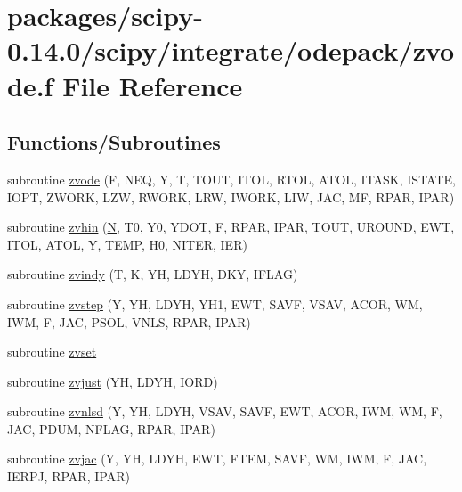 \hypertarget{zvode_8f}{}\section{packages/scipy-\/0.14.0/scipy/integrate/odepack/zvode.f File Reference}
\label{zvode_8f}
\subsection*{Functions/\+Subroutines}
\begin{DoxyCompactItemize}
\item 
subroutine \hyperlink{zvode_8f_af5ace2a9194d9c4094801ada35c63367}{zvode} (F, N\+E\+Q, Y, T, T\+O\+U\+T, I\+T\+O\+L, R\+T\+O\+L, A\+T\+O\+L, I\+T\+A\+S\+K, I\+S\+T\+A\+T\+E, I\+O\+P\+T, Z\+W\+O\+R\+K, L\+Z\+W, R\+W\+O\+R\+K, L\+R\+W, I\+W\+O\+R\+K, L\+I\+W, J\+A\+C, M\+F, R\+P\+A\+R, I\+P\+A\+R)
\item 
subroutine \hyperlink{zvode_8f_afcb58ea2f0858330f2f2fdefc0319f13}{zvhin} (\hyperlink{polmisc_8c_a0240ac851181b84ac374872dc5434ee4}{N}, T0, Y0, Y\+D\+O\+T, F, R\+P\+A\+R, I\+P\+A\+R, T\+O\+U\+T, U\+R\+O\+U\+N\+D, E\+W\+T, I\+T\+O\+L, A\+T\+O\+L, Y, T\+E\+M\+P, H0, N\+I\+T\+E\+R, I\+E\+R)
\item 
subroutine \hyperlink{zvode_8f_ada117a7d58c75ce7276b0c6e0de8cff5}{zvindy} (T, K, Y\+H, L\+D\+Y\+H, D\+K\+Y, I\+F\+L\+A\+G)
\item 
subroutine \hyperlink{zvode_8f_ae33537ae2dd3a997c1f907ea9272dd2d}{zvstep} (Y, Y\+H, L\+D\+Y\+H, Y\+H1, E\+W\+T, S\+A\+V\+F, V\+S\+A\+V, A\+C\+O\+R, W\+M, I\+W\+M, F, J\+A\+C, P\+S\+O\+L, V\+N\+L\+S, R\+P\+A\+R, I\+P\+A\+R)
\item 
subroutine \hyperlink{zvode_8f_a036a28c3bfc3eb5eec8c915d13a78105}{zvset}
\item 
subroutine \hyperlink{zvode_8f_a82ec4f5e05877800fa7114387a9478a3}{zvjust} (Y\+H, L\+D\+Y\+H, I\+O\+R\+D)
\item 
subroutine \hyperlink{zvode_8f_a0cb9d8d31ef5e926dfed8c678ad63cae}{zvnlsd} (Y, Y\+H, L\+D\+Y\+H, V\+S\+A\+V, S\+A\+V\+F, E\+W\+T, A\+C\+O\+R, I\+W\+M, W\+M, F, J\+A\+C, P\+D\+U\+M, N\+F\+L\+A\+G, R\+P\+A\+R, I\+P\+A\+R)
\item 
subroutine \hyperlink{zvode_8f_af2592e75ead24053cad840397a290b38}{zvjac} (Y, Y\+H, L\+D\+Y\+H, E\+W\+T, F\+T\+E\+M, S\+A\+V\+F, W\+M, I\+W\+M, F, J\+A\+C, I\+E\+R\+P\+J, R\+P\+A\+R, I\+P\+A\+R)
\item 

\end{DoxyCompactItemize}
